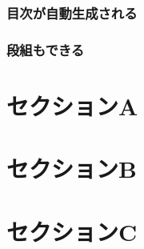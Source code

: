 \documentclass[dvipdfmx]{beamer}
\begin{document}
\frame[plain]{\maketitle}

\begin{frame}{}
  \frametitle{目次が自動生成される}
  \tableofcontents
\end{frame}

\begin{frame}{}
  \frametitle{段組もできる}
    \begin{multicols}{2}
      \tableofcontents[sections={1-2}]
      \columnbreak
      \tableofcontents[sections={3}]
    \end{multicols}
\end{frame}

\section{セクションA}

\section{セクションB}

\section{セクションC}

\end{document}
